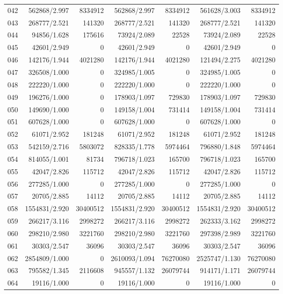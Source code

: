 \begin{longtable}{crrrrrr}
042 & 562868/2.997 & 8334912 & 562868/2.997 & 8334912 & 561628/3.003 & 8334912 \\
043 & 268777/2.521 & 141320 & 268777/2.521 & 141320 & 268777/2.521 & 141320 \\
044 & 94856/1.628 & 175616 & 73924/2.089 & 22528 & 73924/2.089 & 22528 \\
045 & 42601/2.949 & 0 & 42601/2.949 & 0 & 42601/2.949 & 0 \\
046 & 142176/1.944 & 4021280 & 142176/1.944 & 4021280 & 121494/2.275 & 4021280 \\
047 & 326508/1.000 & 0 & 324985/1.005 & 0 & 324985/1.005 & 0 \\
048 & 222220/1.000 & 0 & 222220/1.000 & 0 & 222220/1.000 & 0 \\
049 & 196276/1.000 & 0 & 178903/1.097 & 729830 & 178903/1.097 & 729830 \\
050 & 149690/1.000 & 0 & 149158/1.004 & 731414 & 149158/1.004 & 731414 \\
051 & 607628/1.000 & 0 & 607628/1.000 & 0 & 607628/1.000 & 0 \\
052 & 61071/2.952 & 181248 & 61071/2.952 & 181248 & 61071/2.952 & 181248 \\
053 & 542159/2.716 & 5803072 & 828335/1.778 & 5974464 & 796880/1.848 & 5974464 \\
054 & 814055/1.001 & 81734 & 796718/1.023 & 165700 & 796718/1.023 & 165700 \\
055 & 42047/2.826 & 115712 & 42047/2.826 & 115712 & 42047/2.826 & 115712 \\
056 & 277285/1.000 & 0 & 277285/1.000 & 0 & 277285/1.000 & 0 \\
057 & 20705/2.885 & 14112 & 20705/2.885 & 14112 & 20705/2.885 & 14112 \\
058 & 1554831/2.920 & 30400512 & 1554831/2.920 & 30400512 & 1554831/2.920 & 30400512 \\
059 & 266217/3.116 & 2998272 & 266217/3.116 & 2998272 & 262333/3.162 & 2998272 \\
060 & 298210/2.980 & 3221760 & 298210/2.980 & 3221760 & 297398/2.989 & 3221760 \\
061 & 30303/2.547 & 36096 & 30303/2.547 & 36096 & 30303/2.547 & 36096 \\
062 & 2854809/1.000 & 0 & 2610093/1.094 & 76270080 & 2525747/1.130 & 76270080 \\
063 & 795582/1.345 & 2116608 & 945557/1.132 & 26079744 & 914171/1.171 & 26079744 \\
064 & 19116/1.000 & 0 & 19116/1.000 & 0 & 19116/1.000 & 0 \\

\end{longtable}
